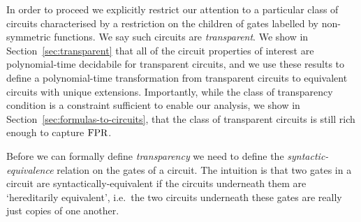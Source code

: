 \documentclass[../paper.tex]{subfiles}
\begin{document}
In order to proceed we explicitly restrict our attention to a particular class
of circuits characterised by a restriction on the children of gates labelled by
non-symmetric functions. We say such circuits are \emph{transparent}. We show in
Section~\ref{sec:transparent} that all of the circuit properties of interest are
polynomial-time decidabile for transparent circuits, and we use these results to
define a polynomial-time transformation from transparent circuits to equivalent
circuits with unique extensions. Importantly, while the class of transparency
condition is a constraint sufficient to enable our analysis, we show in
Section~\ref{sec:formulas-to-circuits}, that the class of transparent circuits
is still rich enough to capture $\text{\upshape FPR}$.

Before we can formally define \emph{transparency} we need to define the
\emph{syntactic-equivalence} relation on the gates of a circuit. The intuition
is that two gates in a circuit are syntactically-equivalent if the circuits
underneath them are `hereditarily equivalent', i.e.\ the two circuits underneath
these gates are really just copies of one another.


\end{document}
